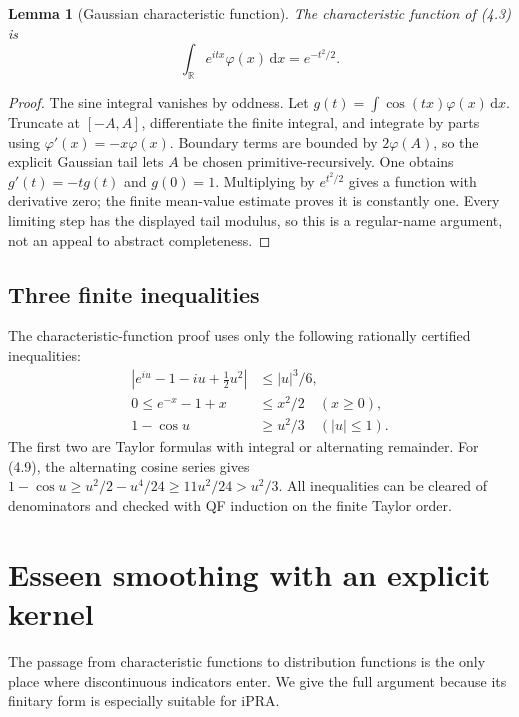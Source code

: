 \documentclass[11pt]{article}
\newtheorem{lemma}[theorem]{Lemma}
\newcommand{\R}{\mathbb R}
\newcommand{\dd}{\,\mathrm d}
\newcommand{\phiN}{\varphi}
\newcommand{\abs}[1]{\left|#1\right|}
\newcommand{\ipra}{\mathrm{iPRA}}
\begin{document}
\begin{lemma}[Gaussian characteristic function]\label{lem:gauss-cf}
The characteristic function of (4.3) is
\[
 \int_{\R}e^{itx}\phiN(x)\dd x=e^{-t^2/2}.            \tag{4.6}
\]
\end{lemma}

\begin{proof}
The sine integral vanishes by oddness.  Let
\(g(t)=\int\cos(tx)\phiN(x)\dd x\).  Truncate at \([-A,A]\), differentiate
the finite integral, and integrate by parts using
\(\phiN'(x)=-x\phiN(x)\).  Boundary terms are bounded by
\(2\phiN(A)\), so the explicit Gaussian tail lets \(A\) be chosen
primitive-recursively.  One obtains \(g'(t)=-tg(t)\) and \(g(0)=1\).
Multiplying by \(e^{t^2/2}\) gives a function with derivative zero; the
finite mean-value estimate proves it is constantly one.  Every limiting step
has the displayed tail modulus, so this is a regular-name argument, not an
appeal to abstract completeness.
\end{proof}

\subsection{Three finite inequalities}

The characteristic-function proof uses only the following rationally
certified inequalities:
\begin{align}
 \abs{e^{iu}-1-iu+\tfrac12u^2}&\le |u|^3/6,           \tag{4.7}\\
 0\le e^{-x}-1+x&\le x^2/2 \quad(x\ge0),             \tag{4.8}\\
 1-\cos u&\ge u^2/3 \quad(|u|\le1).                  \tag{4.9}
\end{align}
The first two are Taylor formulas with integral or alternating remainder.
For (4.9), the alternating cosine series gives
\(1-\cos u\ge u^2/2-u^4/24\ge11u^2/24>u^2/3\).
All inequalities can be cleared of denominators and checked with QF
induction on the finite Taylor order.

\section{Esseen smoothing with an explicit kernel}\label{sec:smoothing}

The passage from characteristic functions to distribution functions is the
only place where discontinuous indicators enter.  We give the full argument
because its finitary form is especially suitable for \(\ipra\).
\end{document}
